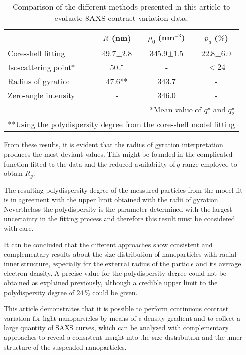 \begin{table}
\caption{Comparison of the different methods presented in this article to evaluate SAXS contrast variation data.}
\begin{tabular}{l|ccc}
 & \( R\) (nm)    & \(\rho_0\) (nm\(^{-3}\)) & \(p_d\) (\(\%\))\\
\hline
 Core-shell fitting &  49.7\(\pm 2.8\)   &     345.9\(\pm 1.5\)      & 22.8\(\pm 6.0\) \\
 Isoscattering point* &  50.5 &     -          & $<24$  \\
 Radius of gyration &  47.6**      &     343.7      & -    \\
 Zero-angle intensity &  -    &     346.0      & -    \\ \hline
\multicolumn{4}{r}{*Mean value of \(q^{\star}_1\) and \(q^{\star}_2\)}\\  
\multicolumn{4}{r}{**Using the polydispersity degree from the core-shell model fitting}\\ 
\end{tabular}
\label{tab:comparison_results_Kisker}
\end{table}

From these results, it is evident that the radius of gyration interpretation produces the most deviant values. This might be founded in the complicated function fitted to the data and the reduced availability of $q$-range employed to obtain \( R_g \).

The resulting polydispersity degree of the measured particles from the model fit is in agreement with the upper limit obtained with the radii of gyration. Nevertheless the polydispersity is the parameter determined with the largest uncertainty in the fitting process and therefore this result must be considered with care.

It can be concluded that the different approaches show consistent and complementary results about the size distribution of nanoparticles with radial inner structure, especially for the external radius of the particle and its average electron density. A precise value for the polydispersity degree could not be obtained as explained previously, although a credible upper limit to the polydispersity degree of $24\,\%$ could be given.

This article demonstrates that it is possible to perform continuous contrast variation for light nanoparticles by means of a density gradient and to collect a large quantity of SAXS curves, which can be analyzed with complementary approaches to reveal a consistent insight into the size distribution and the inner structure of the suspended nanoparticles. 

